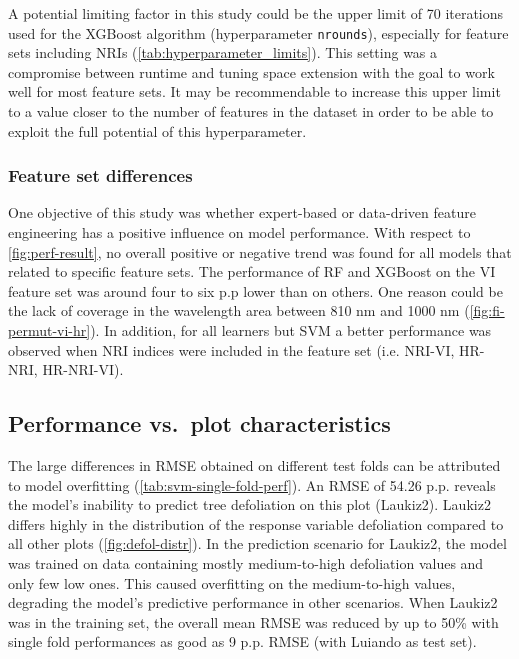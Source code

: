 \documentclass[remotesensing,article,submit,moreauthors,pdftex]{Definitions/mdpi}
\begin{document}
A potential limiting factor in this study could be the upper limit of 70 iterations used for the XGBoost algorithm (hyperparameter \texttt{nrounds}), especially for feature sets including NRIs (\autoref{tab:hyperparameter_limits}).
This setting was a compromise between runtime and tuning space extension with the goal to work well for most feature sets.
It may be recommendable to increase this upper limit to a value closer to the number of features in the dataset in order to be able to exploit the full potential of this hyperparameter.

\subsubsection{Feature set differences}

One objective of this study was whether expert-based or data-driven feature engineering has a positive influence on model performance.
With respect to \autoref{fig:perf-result}, no overall positive or negative trend was found for all models that related to specific feature sets.
The performance of RF and XGBoost on the VI feature set was around four to six p.p lower than on others.
One reason could be the lack of coverage in the wavelength area between 810 nm and 1000 nm (\autoref{fig:fi-permut-vi-hr}).
In addition, for all learners but SVM a better performance was observed when NRI indices were included in the feature set (i.e. NRI-VI, HR-NRI, HR-NRI-VI).

\subsection{Performance vs.\ plot characteristics}
\label{subsec:perf-plot-char}

The large differences in RMSE obtained on different test folds can be attributed to model overfitting (\autoref{tab:svm-single-fold-perf}).
An RMSE of 54.26 p.p. reveals the model's inability to predict tree defoliation on this plot (Laukiz2).
Laukiz2 differs highly in the distribution of the response variable defoliation compared to all other plots (\autoref{fig:defol-distr}).
In the prediction scenario for Laukiz2, the model was trained on data containing mostly medium-to-high defoliation values and only few low ones.
This caused overfitting on the medium-to-high values, degrading the model's predictive performance in other scenarios.
When Laukiz2 was in the training set, the overall mean RMSE was reduced by up to 50\% with single fold performances as good as 9 p.p. RMSE (with Luiando as test set).
\end{document}
